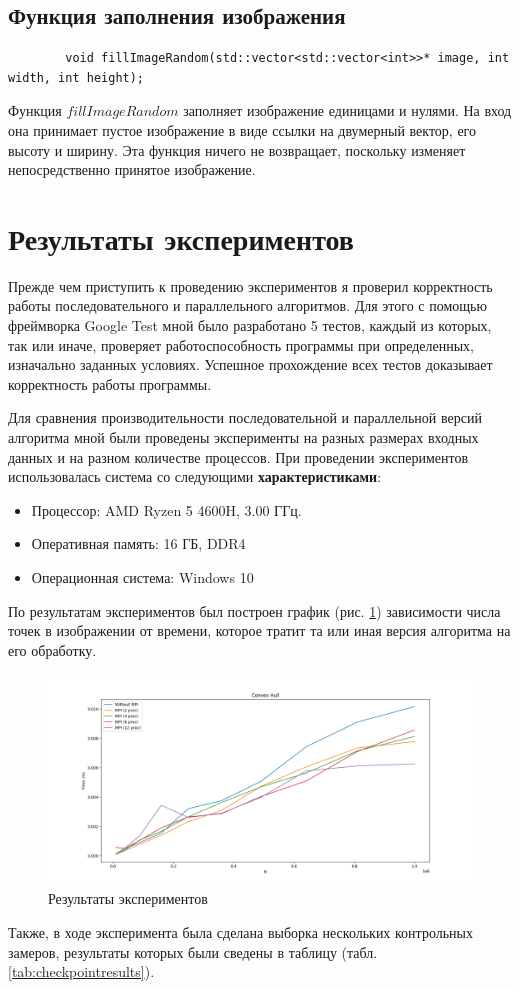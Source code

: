 \documentclass[a4paper, 12pt]{extarticle}
\newcommand{\n}{\par}
\begin{document}
	\subsection{Функция заполнения изображения}
	\begin{verbatim}
		void fillImageRandom(std::vector<std::vector<int>>* image, int width, int height);
	\end{verbatim}
	Функция $fillImageRandom$ заполняет изображение единицами и нулями. На вход она принимает пустое изображение в виде ссылки на двумерный вектор, его высоту и ширину. Эта функция ничего не возвращает, поскольку изменяет непосредственно принятое изображение.
	\newpage
	\section{Результаты экспериментов}
	Прежде чем приступить к проведению экспериментов я проверил корректность работы последовательного и параллельного алгоритмов. Для этого с помощью фреймворка Google Test мной было разработано 5 тестов, каждый из которых, так или иначе, проверяет работоспособность программы при определенных, изначально заданных условиях. Успешное прохождение всех тестов доказывает корректность работы программы.\n
	Для сравнения производительности последовательной и параллельной версий алгоритма мной были проведены эксперименты на разных размерах входных данных и на разном количестве процессов. При проведении экспериментов использовалась система со следующими \textbf{характеристиками}:
	\begin{itemize}
		\item Процессор: AMD Ryzen 5 4600H, 3.00 ГГц.
		\item Оперативная память: 16 ГБ, DDR4
		\item Операционная система: Windows 10
	\end{itemize}
	По результатам экспериментов был построен график (рис. \ref{fig:results}) зависимости числа точек в изображении от времени, которое тратит та или иная версия алгоритма на его обработку.
	\begin{figure}[H]
		\centering
		\includegraphics[width=\linewidth]{img/test.png}
		\caption{Результаты экспериментов}
		\label{fig:results}
	\end{figure}
	Также, в ходе эксперимента была сделана выборка нескольких контрольных замеров, результаты которых были сведены в таблицу (табл. \ref{tab:checkpointresults}).
	
\end{document}
